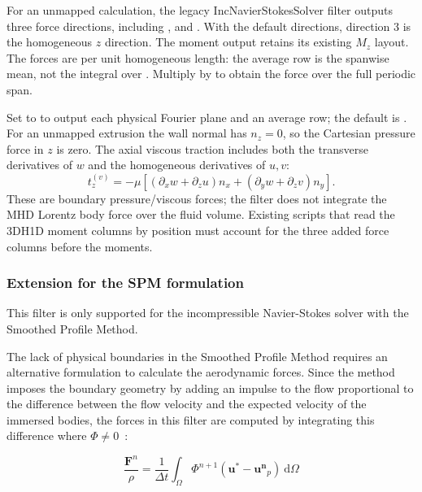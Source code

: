 For an unmapped  calculation, the legacy IncNavierStokesSolver filter
outputs three force directions, including , 
and . With the default directions, direction 3 is the
homogeneous $z$ direction. The moment output retains its existing $M_z$
layout. The forces are per unit homogeneous length: the average row is the
spanwise mean, not the integral over . Multiply by  to
obtain the force over the full periodic span.

Set  to  to output each physical Fourier
plane and an average row; the default is . For an unmapped
extrusion the wall normal has $n_z=0$, so the Cartesian pressure force in $z$
is zero. The axial viscous traction includes both the transverse derivatives
of $w$ and the homogeneous derivatives of $u,v$:
\[
 t_z^{(v)}=-\mu\left[
  (\partial_xw+\partial_zu)n_x+
  (\partial_yw+\partial_zv)n_y\right].
\]
These are boundary pressure/viscous forces; the filter does not integrate the
MHD Lorentz body force over the fluid volume. Existing scripts that read the
3DH1D moment columns by position must account for the three added force
columns before the moments.

\subsubsection{Extension for the SPM formulation}\label{filters:sub:ForcesSPM}

\begin{notebox}
    This filter is only supported for the incompressible Navier-Stokes solver
    with the Smoothed Profile Method.
\end{notebox}

The lack of physical boundaries in the Smoothed Profile Method requires an
alternative formulation to calculate the aerodynamic forces. Since the method
imposes the boundary geometry by adding an impulse to the flow proportional to
the difference between the flow velocity and the expected velocity of the
immersed bodies, the forces in this filter are computed by integrating this
difference where $\Phi \neq 0$~\cite{LuoSPM}:

\begin{equation*}
    \frac{\mathbf{F}^n}{\rho} = \frac{1}{\Delta t} \int_{\Omega}
        \Phi^{n+1}(\mathbf{u^*} - \mathbf{u^n}_p)~\text{d}\Omega
\end{equation*}

